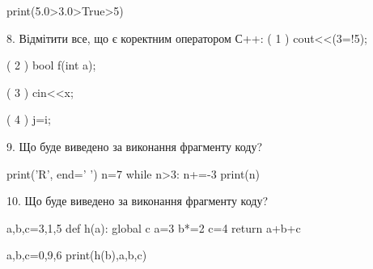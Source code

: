 \documentclass[11pt]{article}
\begin{document}
print(5.0>3.0>True>5)
\vspace{5mm}

8. %
Відмітити все, що є коректним оператором С++:
( 1 ) cout<<(3=!5);

( 2 ) bool f(int a);

( 3 ) cin<<x;

( 4 ) j=i;
\vspace{5mm}

9. Що буде виведено за виконання фрагменту коду?

print('R', end=' ')
n=7
while n>3:
    n+=-3
print(n)

\vspace{5mm}

10. Що буде виведено за виконання фрагменту коду?

a,b,c=3,1,5
def h(a):
global c    a=3
    b*=2
    c=4
    return a+b+c

a,b,c=0,9,6
print(h(b),a,b,c)
\vspace{5mm}

\newpage
\end{document}

